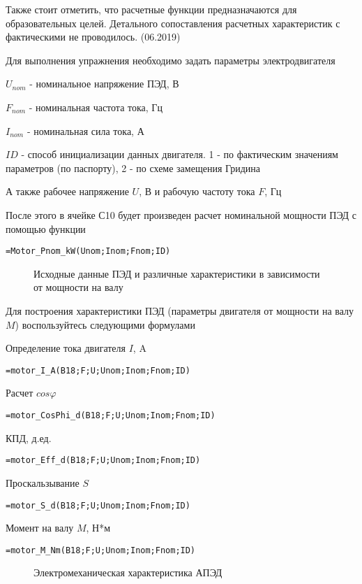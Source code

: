 Также стоит отметить, что расчетные функции предназначаются для образовательных целей. Детального сопоставления расчетных характеристик с фактическими не проводилось. (06.2019)

Для выполнения упражнения необходимо задать параметры электродвигателя

$U_{nom}$ - номинальное напряжение ПЭД, В

$F_{nom}$ - номинальная частота тока, Гц

$I_{nom}$ - номинальная сила тока, А

$ID$ - способ инициализации данных двигателя. 1 - по фактическим значениям параметров (по паспорту), 2 - по схеме замещения Гридина

А также рабочее напряжение $U$, В и рабочую частоту тока $F$, Гц

После этого в ячейке С10 будет произведен расчет номинальной мощности ПЭД с помощью функции

{ \small  \texttt{=Motor\_Pnom\_kW(Unom;Inom;Fnom;ID)}}

\begin{figure}[h!]
	\center{\texttt{[image: Ex80\_1]}}
	\caption{Исходные данные ПЭД и различные характеристики в зависимости от мощности на валу}
	\label{ris:Ex80_1}
\end{figure}

Для построения характеристики ПЭД (параметры двигателя от мощности на валу $M$) воспользуйтесь следующими формулами

Определение тока двигателя $I$, A

{ \small  \texttt{=motor\_I\_A(B18;F;U;Unom;Inom;Fnom;ID)}}

Расчет $cos \varphi $

{ \small  \texttt{=motor\_CosPhi\_d(B18;F;U;Unom;Inom;Fnom;ID)}}

КПД, д.ед.

{ \small  \texttt{=motor\_Eff\_d(B18;F;U;Unom;Inom;Fnom;ID)}}

Проскальзывание $S$

{ \small  \texttt{=motor\_S\_d(B18;F;U;Unom;Inom;Fnom;ID)}}

Момент на валу $M$, Н*м

{ \small  \texttt{=motor\_M\_Nm(B18;F;U;Unom;Inom;Fnom;ID)}}

\begin{figure}[h!]
	\center{\texttt{[image: Ex80\_2]}}
	\caption{Электромеханическая характеристика АПЭД}
	\label{ris:Ex80_2}
\end{figure}

